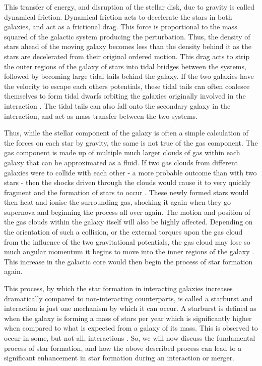 This transfer of energy, and disruption of the stellar disk, due to gravity is called dynamical friction. Dynamical friction acts to decelerate the stars in both galaxies, and act as a frictional drag. This force is proportional to the mass squared of the galactic system producing the perturbation. Thus, the density of stars ahead of the moving galaxy becomes less than the density behind it as the stars are decelerated from their original ordered motion. This drag acts to strip the outer regions of the galaxy of stars into tidal bridges between the systems, followed by becoming large tidal tails behind the galaxy. If the two galaxies have the velocity to escape each others potentials, these tidal tails can often coalesce themselves to form tidal dwarfs orbiting the galaxies originally involved in the interaction \citep{Paper about tidal dwarfs}. The tidal tails can also fall onto the secondary galaxy in the interaction, and act as mass transfer between the two systems.

Thus, while the stellar component of the galaxy is often a simple calculation of the forces on each star by gravity, the same is not true of the gas component. The gas component is made up of multiple much larger clouds of gas within each galaxy that can be approximated as a fluid. If two gas clouds from different galaxies were to collide with each other - a more probable outcome than with two stars - then the shocks driven through the clouds would cause it to very quickly fragment and the formation of stars to occur \citep{Papers on fragmentation of gas in interaction, paper on star formation in star fragments}. These newly formed stars would then heat and ionise the surrounding gas, shocking it again when they go supernova and beginning the process all over again. The motion and position of the gas clouds within the galaxy itself will also be highly affected. Depending on the orientation of such a collision, or the external torques upon the gas cloud from the influence of the two gravitational potentials, the gas cloud may lose so much angular momentum it begins to move into the inner regions of the galaxy \citep{Need a paper which talks about torques on gas in a system and the feedback involved here.}. This increase in the galactic core would then begin the process of star formation again. 

This process, by which the star formation in interacting galaxies increases dramatically compared to non-interacting counterparts, is called a starburst and interaction is just one mechanism by which it can occur. A starburst is defined as when the galaxy is forming a mass of stars per year which is significantly higher when compared to what is expected from a galaxy of its mass. This is observed to occur in some, but not all, interactions \citep{Review paper on starbursts in galaxies}. So, we will now discuss the fundamental process of star formation, and how the above described process can lead to a significant enhancement in star formation during an interaction or merger.


